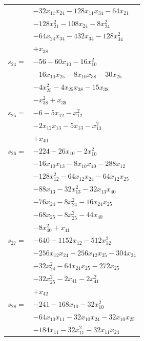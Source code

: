 \begin{longtable}{@{}r@{\;}l@{}}
 & \(\displaystyle -32x_{11}x_{24} -128x_{11}x_{34} -64x_{21}\) \\
 & \(\displaystyle -128x_{21}^{2} -108x_{24} -8x_{24}^{2}\) \\
 & \(\displaystyle -64x_{24}x_{34} -432x_{34} -128x_{34}^{2}\) \\
 & \(\displaystyle +x_{38}\) \\[3pt]
\(s_{24}=\) & \(\displaystyle -56 -60x_{10} -16x_{10}^{2}\) \\
 & \(\displaystyle -16x_{10}x_{25} -8x_{10}x_{38} -30x_{25}\) \\
 & \(\displaystyle -4x_{25}^{2} -4x_{25}x_{38} -15x_{38}\) \\
 & \(\displaystyle -x_{38}^{2} +x_{39}\) \\[3pt]
\(s_{25}=\) & \(\displaystyle -6 -5x_{12} -x_{12}^{2}\) \\
 & \(\displaystyle -2x_{12}x_{13} -5x_{13} -x_{13}^{2}\) \\
 & \(\displaystyle +x_{40}\) \\[3pt]
\(s_{26}=\) & \(\displaystyle -224 -26x_{10} -2x_{10}^{2}\) \\
 & \(\displaystyle -16x_{10}x_{13} -8x_{10}x_{40} -288x_{12}\) \\
 & \(\displaystyle -128x_{12}^{2} -64x_{12}x_{24} -64x_{12}x_{25}\) \\
 & \(\displaystyle -88x_{13} -32x_{13}^{2} -32x_{13}x_{40}\) \\
 & \(\displaystyle -76x_{24} -8x_{24}^{2} -16x_{24}x_{25}\) \\
 & \(\displaystyle -68x_{25} -8x_{25}^{2} -44x_{40}\) \\
 & \(\displaystyle -8x_{40}^{2} +x_{41}\) \\[3pt]
\(s_{27}=\) & \(\displaystyle -640 -1152x_{12} -512x_{12}^{2}\) \\
 & \(\displaystyle -256x_{12}x_{24} -256x_{12}x_{25} -304x_{24}\) \\
 & \(\displaystyle -32x_{24}^{2} -64x_{24}x_{25} -272x_{25}\) \\
 & \(\displaystyle -32x_{25}^{2} -2x_{41} -2x_{41}^{2}\) \\
 & \(\displaystyle +x_{42}\) \\[3pt]
\(s_{28}=\) & \(\displaystyle -241 -168x_{10} -32x_{10}^{2}\) \\
 & \(\displaystyle -64x_{10}x_{11} -32x_{10}x_{24} -32x_{10}x_{25}\) \\
 & \(\displaystyle -184x_{11} -32x_{11}^{2} -32x_{11}x_{24}\) \\

\end{longtable}
